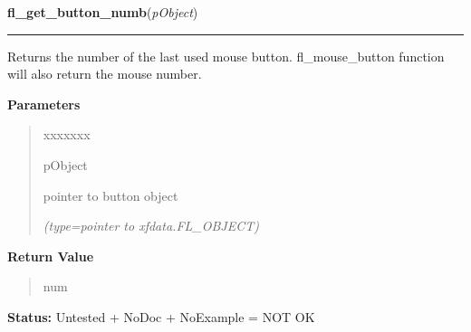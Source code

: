 \hspace{.8\funcindent}\begin{boxedminipage}{\funcwidth}

    \raggedright \textbf{fl\_get\_button\_numb}(\textit{pObject})

    \vspace{-1.5ex}

    \rule{\textwidth}{0.5\fboxrule}
\setlength{\parskip}{2ex}
    Returns the number of the last used mouse button. fl\_mouse\_button 
    function will also return the mouse number.

\setlength{\parskip}{1ex}
      \textbf{Parameters}
      \vspace{-1ex}

      \begin{quote}
        \begin{Ventry}{xxxxxxx}

          \item[pObject]

          pointer to button object

            {\it (type=pointer to xfdata.FL\_OBJECT)}

        \end{Ventry}

      \end{quote}

      \textbf{Return Value}
    \vspace{-1ex}

      \begin{quote}
      num

      \end{quote}

\textbf{Status:} Untested + NoDoc + NoExample = NOT OK



    \end{boxedminipage}

    \label{xformslib:library:fl_set_object_shortcut}

    \vspace{0.5ex}

